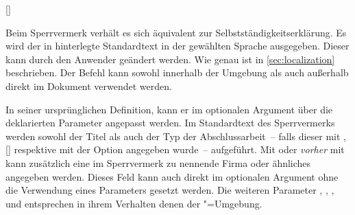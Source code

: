 \begin{Declaration*}{}
\begin{Declaration*}{}
\begin{Declaration*}{}
\begin{Declaration}[v2.02]{[]}
\begin{Declaration}{}
\begin{Declaration}{}
\begin{Declaration}{}
\begin{Declaration}{}
\begin{Declaration}{}
\begin{Declaration}{}
\printdeclarationlist%
%
Beim Sperrvermerk verhält es sich äquivalent zur Selbstständigkeitserklärung.
Es wird der in  hinterlegte Standardtext in der gewählten 
Sprache ausgegeben. Dieser kann durch den Anwender geändert werden. Wie genau 
ist in \autoref{sec:localization} beschrieben. Der Befehl  
kann sowohl innerhalb der Umgebung  als auch 
außerhalb direkt im Dokument verwendet werden. 

In seiner ursprünglichen Definition, kann er im optionalen Argument über die 
deklarierten Parameter angepasst werden. Im Standardtext des Sperrvermerks 
werden sowohl der Titel als auch der Typ der Abschlussarbeit~-- falls dieser 
mit , []
respektive mit der Option  angegeben wurde~-- aufgeführt. 
Mit  oder \emph{vorher} mit  kann 
zusätzlich eine im Sperrvermerk zu nennende Firma oder ähnliches angegeben 
werden. Dieses Feld kann auch direkt im optionalen Argument ohne die Verwendung 
eines Parameters gesetzt werden. Die weiteren Parameter 
, 
, 
, 
 und 
 entsprechen in ihrem Verhalten denen 
der "=Umgebung.
\end{Declaration}
\end{Declaration}
\end{Declaration}
\end{Declaration}
\end{Declaration}
\end{Declaration}
\end{Declaration}


\end{Declaration*}
\end{Declaration*}
\end{Declaration*}
